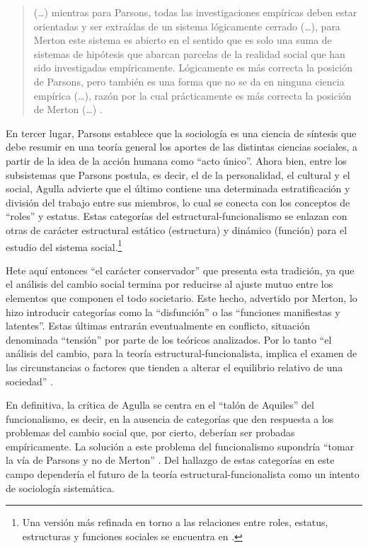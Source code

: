 \begin{quote}
(\dots) mientras para Parsons, todas las investigaciones empíricas deben estar orientadas y ser extraídas de un sistema lógicamente cerrado (\dots), para Merton este sistema es abierto en el sentido que es solo una suma de sistemas de hipótesis que abarcan parcelas de la realidad social que han sido investigadas empíricamente. Lógicamente es más correcta la posición de Parsons, pero también es una forma que no se da en ninguna ciencia empírica (\dots), razón por la cual prácticamente es más correcta la posición de Merton (\dots) \parencite[57]{1640-AGULLA1962}.
\end{quote}

En tercer lugar, Parsons establece que la sociología es una ciencia de síntesis que debe resumir en una teoría general los aportes de las distintas ciencias sociales, a partir de la idea de la acción humana como \enquote{acto único}. Ahora bien, entre los subsistemas que Parsons postula, es decir, el de la personalidad, el cultural y el social, Agulla advierte que el último contiene una determinada estratificación y división del trabajo entre sus miembros, lo cual se conecta con los conceptos de \enquote{roles} y estatus. Estas categorías del estructural-funcionalismo se enlazan con otras de carácter estructural estático (estructura) y dinámico (función) para el estudio del sistema social.\footnote{Una versión más refinada en torno a las relaciones entre roles, estatus, estructuras y funciones sociales se encuentra en \textcite{1635-AGULLA1964}.}

Hete aquí entonces \enquote{el carácter conservador} \parencite[109]{1640-AGULLA1962} que presenta esta tradición, ya que el análisis del cambio social termina por reducirse al ajuste mutuo entre los elementos que componen el todo societario. Este hecho, advertido por Merton, lo hizo introducir categorías como la \enquote{disfunción} o las \enquote{funciones manifiestas y latentes}. Estas últimas entrarán eventualmente en conflicto, situación denominada \enquote{tensión} por parte de los teóricos analizados. Por lo tanto \enquote{el análisis del cambio, para la teoría estructural-funcionalista, implica el examen de las circunstancias o factores que tienden a alterar el equilibrio relativo de una sociedad} \parencite[131]{1640-AGULLA1962}.

En definitiva, la crítica de Agulla se centra en el \enquote{talón de Aquiles} del funcionalismo, es decir, en la ausencia de categorías que den respuesta a los problemas del cambio social que, por cierto, deberían ser probadas empíricamente. La solución a este problema del funcionalismo supondría \enquote{tomar la vía de Parsons y no de Merton} \parencite[158]{1640-AGULLA1962}. Del hallazgo de estas categorías en este campo dependería el futuro de la teoría estructural-funcionalista como un intento de sociología sistemática.

